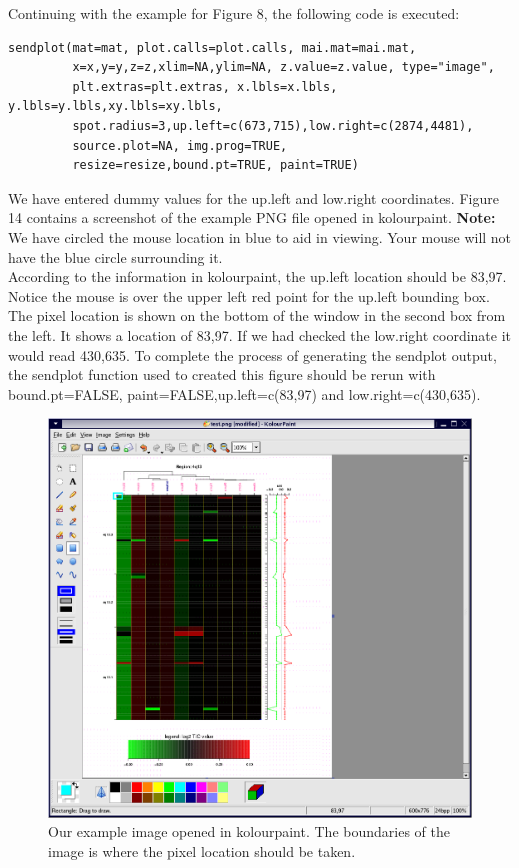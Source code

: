 \documentclass[]{article}
\begin{document}
\indent Continuing with the example for Figure 8, the following code is executed:
\begin{verbatim}
sendplot(mat=mat, plot.calls=plot.calls, mai.mat=mai.mat,
         x=x,y=y,z=z,xlim=NA,ylim=NA, z.value=z.value, type="image",
         plt.extras=plt.extras, x.lbls=x.lbls, y.lbls=y.lbls,xy.lbls=xy.lbls, 
         spot.radius=3,up.left=c(673,715),low.right=c(2874,4481),
         source.plot=NA, img.prog=TRUE,
         resize=resize,bound.pt=TRUE, paint=TRUE)
\end{verbatim}
We have entered dummy values for the up.left and low.right coordinates. Figure 14 contains a screenshot of the example PNG file opened in kolourpaint. {\bf{Note:}} We have circled the mouse location in blue to aid in viewing. Your mouse will not have the blue circle surrounding it.\\ \indent  According to the information in kolourpaint, the up.left location should be 83,97. Notice the mouse is over the upper left red point for the up.left bounding box. The pixel location is shown on the bottom of the window in the second box from the left. It shows a location of 83,97. If we had checked the low.right coordinate it would read 430,635. To complete the process of generating the sendplot output, the sendplot function used to created this figure should be rerun with bound.pt=FALSE, paint=FALSE,up.left=c(83,97) and low.right=c(430,635). \newline

\begin{center}
\begin{figure}
\includegraphics{sendPlot3}
\caption{Our example image opened in kolourpaint. The boundaries of the image is where the pixel location should be taken.}
\end{figure}
\end{center}
\end{document}
